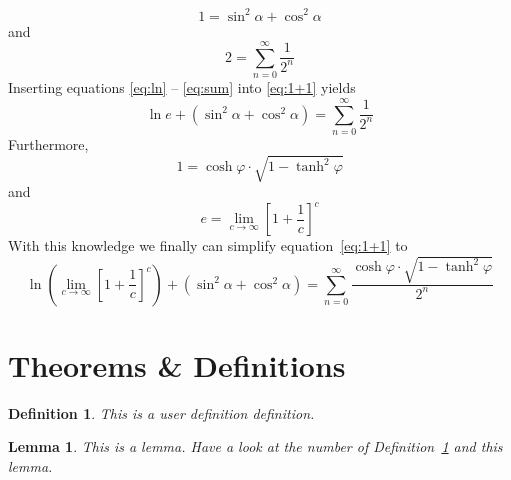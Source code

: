 \documentclass[a4paper,11pt]{article}
\newtheorem{mydefinition}{Definition}
\newtheorem{lemma}{Lemma}
\begin{document}
\begin{equation}
1 = \sin^2 \alpha + \cos^2 \alpha
\end{equation}
and
\begin{equation} \label{eq:sum}
2 = \sum_{n=0}^\infty \frac{1}{2^n}
\end{equation}
Inserting equations \eqref{eq:ln} -- \eqref{eq:sum} into \eqref{eq:1+1} yields
\begin{equation}
\ln e + (\sin^2 \alpha + \cos^2 \alpha) = \sum_{n=0}^\infty \frac{1}{2^n}
\end{equation}
Furthermore,
\begin{equation}
1 = \cosh \varphi \cdot \sqrt{1 - \tanh^2 \varphi}
\end{equation}
and
\begin{equation}
e = \lim_{c \rightarrow \infty} \left[1 + \frac{1}{c} \right]^c
\end{equation}
With this knowledge we finally can simplify equation~\eqref{eq:1+1} to
\begin{equation}
\ln \left(\lim_{c \rightarrow \infty} \left[1 + \frac{1}{c} \right]^c\right) + (\sin^2 \alpha + \cos^2 \alpha) = \sum_{n=0}^\infty \frac{\cosh \varphi \cdot \sqrt{1 - \tanh^2 \varphi}}{2^n}
\end{equation}

\section{Theorems \& Definitions}

\begin{mydefinition}
   This is a user definition definition.
   \label{def_1}
\end{mydefinition}

\begin{lemma}
   This is a lemma. Have a look at the number of Definition~\ref{def_1} and this lemma.
\end{lemma}
\end{document}
